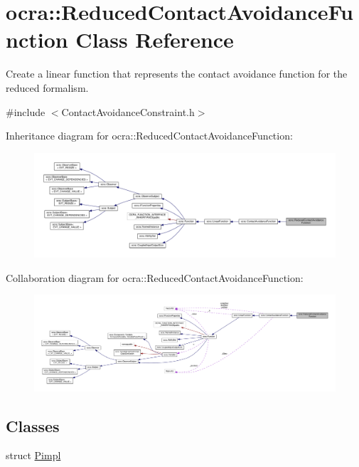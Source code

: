 \hypertarget{classocra_1_1ReducedContactAvoidanceFunction}{}\section{ocra\+:\+:Reduced\+Contact\+Avoidance\+Function Class Reference}
\label{classocra_1_1ReducedContactAvoidanceFunction}


Create a linear function that represents the contact avoidance function for the reduced formalism.  




{\ttfamily \#include $<$Contact\+Avoidance\+Constraint.\+h$>$}



Inheritance diagram for ocra\+:\+:Reduced\+Contact\+Avoidance\+Function\+:
\nopagebreak
\begin{figure}[H]
\begin{center}
\leavevmode
\includegraphics[width=350pt]{d8/dda/classocra_1_1ReducedContactAvoidanceFunction__inherit__graph}
\end{center}
\end{figure}


Collaboration diagram for ocra\+:\+:Reduced\+Contact\+Avoidance\+Function\+:
\nopagebreak
\begin{figure}[H]
\begin{center}
\leavevmode
\includegraphics[width=350pt]{d3/d0b/classocra_1_1ReducedContactAvoidanceFunction__coll__graph}
\end{center}
\end{figure}
\subsection*{Classes}
\begin{DoxyCompactItemize}
\item 
struct \hyperlink{structReducedContactAvoidanceFunction_1_1Pimpl}{Pimpl}
\end{DoxyCompactItemize}
